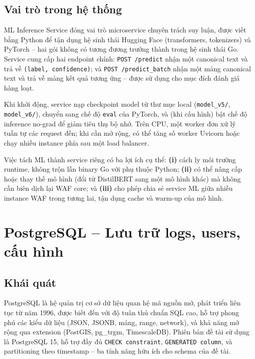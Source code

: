 \documentclass[../DoAn.tex]{subfiles}
\begin{document}
\subsection{Vai trò trong hệ thống}
\label{subsection:3.4.2}

ML Inference Service đóng vai trò microservice chuyên trách suy luận, được
viết bằng Python để tận dụng hệ sinh thái Hugging Face (transformers,
tokenizers) và PyTorch -- hai gói không có tương đương trưởng thành trong
hệ sinh thái Go. Service cung cấp hai endpoint chính: \texttt{POST /predict}
nhận một canonical text và trả về \texttt{(label, confidence)}; và
\texttt{POST /predict\_batch} nhận một mảng canonical text và trả về mảng
kết quả tương ứng -- được sử dụng cho mục đích đánh giá hàng loạt.

Khi khởi động, service nạp checkpoint model từ thư mục local
(\texttt{model\_v5/}, \texttt{model\_v6/}), chuyển sang chế độ \texttt{eval}
của PyTorch, và (khi cấu hình) bật chế độ inference no-grad để giảm tiêu
thụ bộ nhớ. Trên CPU, một worker đơn xử lý tuần tự các request đến; khi cần
mở rộng, có thể tăng số worker Uvicorn hoặc chạy nhiều instance phía sau
một load balancer.

Việc tách ML thành service riêng có ba lợi ích cụ thể: \textbf{(i)} cách
ly môi trường runtime, không trộn lẫn binary Go với phụ thuộc Python; \textbf{(ii)}
có thể nâng cấp hoặc thay thế mô hình (đổi từ DistilBERT sang một mô hình
khác) mà không cần biên dịch lại WAF core; và \textbf{(iii)} cho phép chia
sẻ service ML giữa nhiều instance WAF trong tương lai, tận dụng cache và
warm-up của mô hình.

\section{PostgreSQL -- Lưu trữ logs, users, cấu hình}
\label{section:3.5}

\subsection{Khái quát}
\label{subsection:3.5.1}

PostgreSQL là hệ quản trị cơ sở dữ liệu quan hệ mã nguồn mở, phát triển
liên tục từ năm 1996, được biết đến với độ tuân thủ chuẩn SQL cao, hỗ trợ
phong phú các kiểu dữ liệu (JSON, JSONB, mảng, range, network), và khả
năng mở rộng qua extension (PostGIS, pg\_trgm, TimescaleDB). Phiên bản đề
tài sử dụng là PostgreSQL 15, hỗ trợ đầy đủ \texttt{CHECK constraint},
\texttt{GENERATED column}, và partitioning theo timestamp -- ba tính năng
hữu ích cho schema của đề tài.
\end{document}
